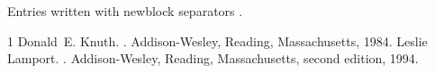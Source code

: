 \documentclass[11pt]{article}
\begin{document}
Entries written with newblock separators \cite{a,b}.

\begin{thebibliography}{1}
 Donald~E. Knuth.
.
\newblock Addison-Wesley, Reading, Massachusetts, 1984.
 Leslie Lamport.
.
\newblock Addison-Wesley, Reading, Massachusetts, second edition, 1994.
\end{thebibliography}
\end{document}
